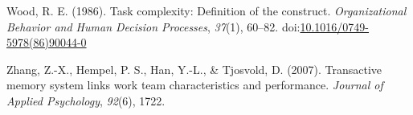 \documentclass[english,,man]{apa6}
\theoremstyle{definition}
\theoremstyle{definition}
\theoremstyle{definition}
\theoremstyle{remark}
\begin{document}
\leavevmode\hypertarget{ref-wood_task_1986}{}%
Wood, R. E. (1986). Task complexity: Definition of the construct.
\emph{Organizational Behavior and Human Decision Processes},
\emph{37}(1), 60--82.
doi:\href{https://doi.org/10.1016/0749-5978(86)90044-0}{10.1016/0749-5978(86)90044-0}

\leavevmode\hypertarget{ref-zhang2007transactive}{}%
Zhang, Z.-X., Hempel, P. S., Han, Y.-L., \& Tjosvold, D. (2007).
Transactive memory system links work team characteristics and
performance. \emph{Journal of Applied Psychology}, \emph{92}(6), 1722.
\end{document}
